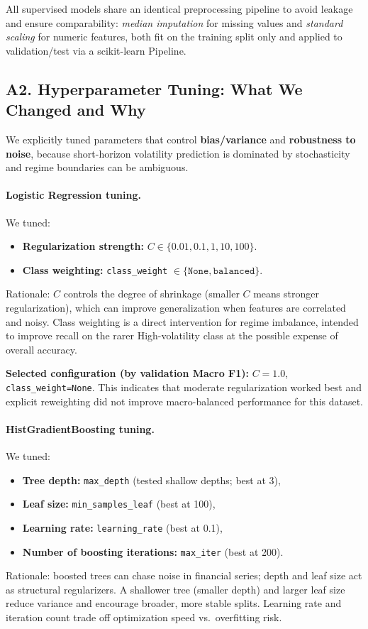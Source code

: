 \documentclass[11pt]{article}
\begin{document}
All supervised models share an identical preprocessing pipeline to avoid leakage and ensure comparability: \textit{median imputation} for missing values and \textit{standard scaling} for numeric features, both fit on the training split only and applied to validation/test via a scikit-learn Pipeline.

\subsection{A2. Hyperparameter Tuning: What We Changed and Why}
We explicitly tuned parameters that control \textbf{bias/variance} and \textbf{robustness to noise}, because short-horizon volatility prediction is dominated by stochasticity and regime boundaries can be ambiguous.

\paragraph{Logistic Regression tuning.}
We tuned:
\begin{itemize}
    \item \textbf{Regularization strength:} $C \in \{0.01, 0.1, 1, 10, 100\}$.
    \item \textbf{Class weighting:} \texttt{class\_weight} $\in \{\texttt{None}, \texttt{balanced}\}$.
\end{itemize}
Rationale: $C$ controls the degree of shrinkage (smaller $C$ means stronger regularization), which can improve generalization when features are correlated and noisy. Class weighting is a direct intervention for regime imbalance, intended to improve recall on the rarer High-volatility class at the possible expense of overall accuracy.

\textbf{Selected configuration (by validation Macro F1):} $C=1.0$, \texttt{class\_weight=None}. This indicates that moderate regularization worked best and explicit reweighting did not improve macro-balanced performance for this dataset.

\paragraph{HistGradientBoosting tuning.}
We tuned:
\begin{itemize}
    \item \textbf{Tree depth:} \texttt{max\_depth} (tested shallow depths; best at 3),
    \item \textbf{Leaf size:} \texttt{min\_samples\_leaf} (best at 100),
    \item \textbf{Learning rate:} \texttt{learning\_rate} (best at 0.1),
    \item \textbf{Number of boosting iterations:} \texttt{max\_iter} (best at 200).
\end{itemize}
Rationale: boosted trees can chase noise in financial series; depth and leaf size act as structural regularizers. A shallower tree (smaller depth) and larger leaf size reduce variance and encourage broader, more stable splits. Learning rate and iteration count trade off optimization speed vs.\ overfitting risk.
\end{document}
